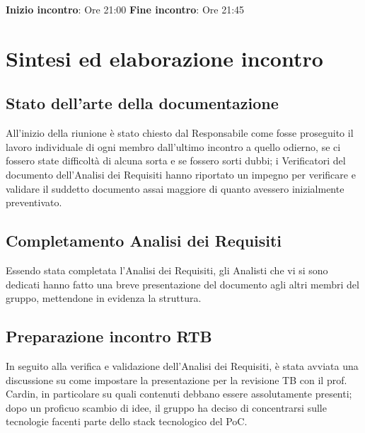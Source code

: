 \documentclass[a4paper, 11pt]{article}
\begin{document}
\vspace{10pt}

\textbf{Inizio incontro}: Ore 21:00 \newline
\textbf{Fine incontro}: Ore 21:45 \newline

\pagebreak

\section{Sintesi ed elaborazione incontro}

\subsection{Stato dell'arte della documentazione}
All'inizio della riunione è stato chiesto dal Responsabile come fosse proseguito il lavoro
individuale di ogni membro dall'ultimo incontro a quello odierno, se ci fossero state difficoltà di alcuna sorta e se fossero sorti dubbi; i Verificatori del documento dell'Analisi dei Requisiti hanno riportato un impegno per
verificare e validare il suddetto documento assai maggiore di quanto avessero inizialmente preventivato.

\subsection{Completamento Analisi dei Requisiti}
Essendo stata completata l'Analisi dei Requisiti, gli Analisti che vi si sono dedicati hanno fatto una breve presentazione del documento agli altri membri del
gruppo, mettendone in evidenza la struttura.

\subsection{Preparazione incontro RTB}
In seguito alla verifica e validazione dell'Analisi dei Requisiti, è stata avviata una discussione su come impostare la presentazione
per la revisione TB con il prof. Cardin, in particolare su quali contenuti debbano essere assolutamente presenti; dopo un proficuo scambio di idee,
il gruppo ha deciso di concentrarsi sulle tecnologie facenti parte dello stack tecnologico del PoC.
\end{document}
